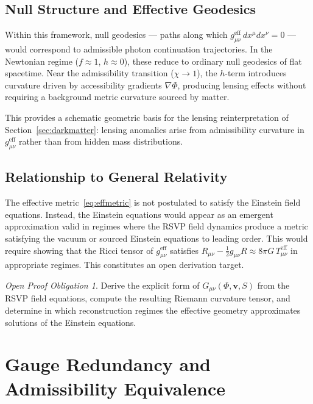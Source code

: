 \documentclass[11pt, a4paper]{article}
\theoremstyle{plain}
\theoremstyle{definition}
\theoremstyle{remark}
\newtheorem{obligation}[theorem]{Open Proof Obligation}
\begin{document}
\subsection{Null Structure and Effective Geodesics}

Within this framework, null geodesics --- paths along which $g_{\mu\nu}^{\mathrm{eff}}
\,dx^\mu dx^\nu = 0$ --- would correspond to admissible photon continuation trajectories.
In the Newtonian regime ($f \approx 1$, $h \approx 0$), these reduce to ordinary
null geodesics of flat spacetime. Near the admissibility transition ($\chi \to 1$),
the $h$-term introduces curvature driven by accessibility gradients $\nabla\Phi$,
producing lensing effects without requiring a background metric curvature sourced by
matter.

This provides a schematic geometric basis for the lensing reinterpretation of
Section~\ref{sec:darkmatter}: lensing anomalies arise from admissibility curvature in
$g_{\mu\nu}^{\mathrm{eff}}$ rather than from hidden mass distributions.

\subsection{Relationship to General Relativity}

The effective metric~\eqref{eq:effmetric} is not postulated to satisfy the Einstein
field equations. Instead, the Einstein equations would appear as an emergent
approximation valid in regimes where the RSVP field dynamics produce a metric
satisfying the vacuum or sourced Einstein equations to leading order. This would
require showing that the Ricci tensor of $g_{\mu\nu}^{\mathrm{eff}}$ satisfies
$R_{\mu\nu} - \frac{1}{2}g_{\mu\nu}R \approx 8\pi G\, T_{\mu\nu}^{\mathrm{eff}}$
in appropriate regimes. This constitutes an open derivation target.

\begin{obligation}
\label{obl:metric}
Derive the explicit form of $G_{\mu\nu}(\Phi, \mathbf{v}, S)$ from the RSVP field
equations, compute the resulting Riemann curvature tensor, and determine in which
reconstruction regimes the effective geometry approximates solutions of the Einstein
equations.
\end{obligation}

\section{Gauge Redundancy and Admissibility Equivalence}
\label{app:gauge}
\end{document}
